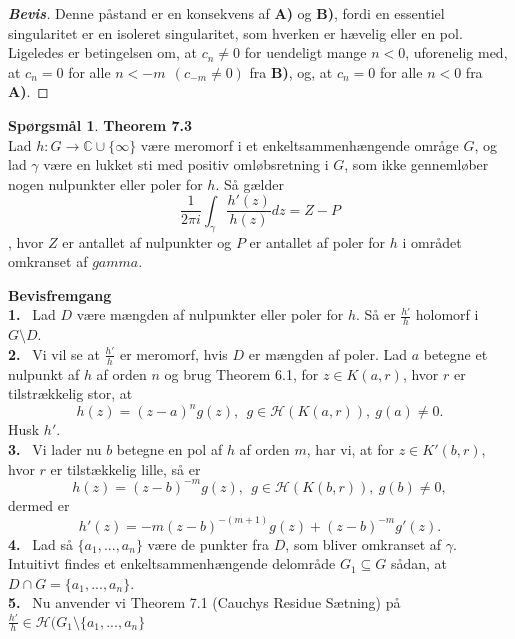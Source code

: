 \documentclass[10pt,a4paper]{article}
\theoremstyle{definition}
\newtheorem{Prob}{Spørgsmål}
\begin{document}
\begin{proof}[\textbf{Bevis}]
Denne påstand er en konsekvens af \textbf{A)} og \textbf{B)}, fordi en essentiel singularitet er en isoleret singularitet, som hverken er hævelig eller en pol. \\
Ligeledes er betingelsen om, at $c_n \neq 0$ for uendeligt mange $n<0$, uforenelig med, \\
at $c_n=0$ for alle $n < -m \ \ (c_{-m} \neq 0)$ fra \textbf{B)}, og, at $c_n=0$ for alle $n<0$ fra \textbf{A)}.
\end{proof}









\newpage
\begin{Prob}{\textbf{Theorem 7.3}} \\

Lad $h: G \rightarrow \mathbb{C} \cup \{\infty\}$ være meromorf i et enkeltsammenhængende områge $G$, og lad $\gamma$ være en lukket sti med positiv omløbsretning i $G$, som ikke gennemløber nogen nulpunkter eller poler for $h$. Så gælder
$$\frac{1}{2\pi i} \int_\gamma \frac{h'(z)}{h(z)} dz = Z-P$$,
hvor $Z$ er antallet af nulpunkter og $P$ er antallet af poler for $h$ i området omkranset af $gamma$.
\end{Prob}

\begin{framed}
\textbf{Bevisfremgang} \\
\textbf{1.} \ Lad $D$ være mængden af nulpunkter eller poler for $h$. Så er $\frac{h'}{h}$ holomorf i $G \setminus D$. \\
\textbf{2.} \ Vi vil se at $\frac{h'}{h}$ er meromorf, hvis $D$ er mængden af poler. Lad $a$ betegne et nulpunkt af $h$ af orden $n$ og brug Theorem 6.1, for  $z \in K(a,r)$, hvor $r$ er tilstrækkelig stor, at
$$h(z) = (z-a)^n g(z), \ \ g \in \mathcal{H}(K(a,r)), \ g(a)\neq 0.$$
Husk $h'$.\\
\textbf{3.} \ Vi lader nu $b$ betegne en pol af $h$ af orden $m$, har vi, at for $z \in K'(b,r)$, hvor $r$ er tilstækkelig lille, så er
$$h(z) = (z-b)^{-m}g(z), \ \ g \in \mathcal{H}(K(b,r)), \ g(b) \neq 0,$$
dermed er
$$h'(z) = -m(z-b)^{-(m+1)}g(z) + (z-b)^{-m} g'(z).$$
\textbf{4.} \ Lad så $\{a_1,...,a_n\}$ være de punkter fra $D$, som bliver omkranset af $\gamma$. Intuitivt findes et enkeltsammenhængende delområde $G_1 \subseteq G$ sådan, at $D \cap G = \{a_1,...,a_n\}$. \\
\textbf{5.} \ Nu anvender vi Theorem 7.1 (Cauchys Residue Sætning) på $\frac{h'}{h} \in \mathcal{H}(G_1 \setminus \{a_1,...,a_n\}$ 
\end{framed}
\end{document}

